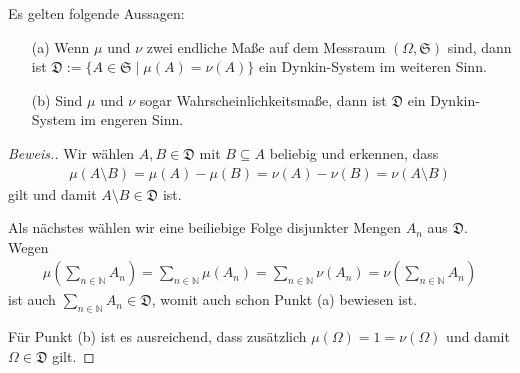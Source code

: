 \begin{lemma}
    Es gelten folgende Aussagen:
    \begin{itemize}
        \item[(a)] Wenn $\mu$ und $\nu$ zwei endliche Maße auf dem Messraum $(\Omega,\mathfrak{S})$ sind, dann ist $\mathfrak{D}:=\{A\in\mathfrak{S}\mid\mu(A)=\nu(A)\}$ ein Dynkin-System im weiteren Sinn. 
        \item[(b)] Sind $\mu$ und $\nu$ sogar Wahrscheinlichkeitsmaße, dann ist $\mathfrak{D}$ ein Dynkin-System im engeren Sinn. 
    \end{itemize}
\end{lemma} 
\begin{proof}[Beweis.]
    Wir wählen $A,B \in \mathfrak{D}$ mit $B \subseteq A$ beliebig und erkennen, dass 
    \begin{align*}
        \mu(A \setminus B) = \mu(A) - \mu(B) = \nu(A) - \nu(B) = \nu(A \setminus B)
    \end{align*}
    gilt und damit $A \setminus B \in \mathfrak{D}$ ist.

    Als nächstes wählen wir eine beiliebige Folge disjunkter Mengen $A_n$ aus $\mathfrak{D}$. Wegen
    \begin{align*}
        \mu\left(\sum_{n \in \mathbb{N}} A_n \right) = \sum_{n \in \mathbb{N}} \mu(A_n) = \sum_{n \in \mathbb{N}} \nu(A_n) = \nu\left( \sum_{n \in \mathbb{N}} A_n \right)
    \end{align*}
    ist auch $\sum_{n \in \mathbb{N}} A_n \in \mathfrak{D}$, womit auch schon Punkt (a) bewiesen ist.

    Für Punkt (b) ist es ausreichend, dass zusätzlich $\mu(\Omega) = 1 = \nu(\Omega)$ und damit $\Omega \in \mathfrak{D}$ gilt.
\end{proof}
